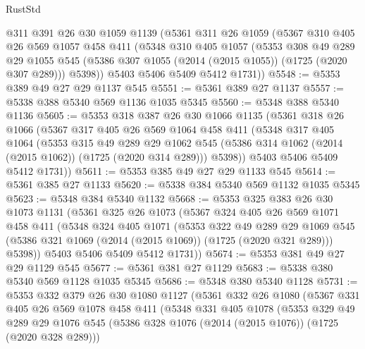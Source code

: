 \begin{lexlean}{RustStd}
\begin{coremodule}
    @311
    @391
    @26
    @30
    @1059
    @1139
    (@5361
      @311
      @26
      @1059
      (@5367
        @310
        @405
        @26
        @569
        @1057
        @458
        @411
        (@5348
          @310
          @405
          @1057
          (@5353
            @308
            @49
            @289
            @29
            @1055
            @545
            (@5386 @307 @1055 (@2014 (@2015 @1055)) (@1725 (@2020 @307 @289)))
            @5398))
        @5403
        @5406
        @5409
        @5412
        @1731))
@5548 := @5353 @389 @49 @27 @29 @1137 @545
@5551 := @5361 @389 @27 @1137
@5557 := @5338 @388 @5340 @569 @1136 @1035 @5345
@5560 := @5348 @388 @5340 @1136
@5605 := @5353
    @318
    @387
    @26
    @30
    @1066
    @1135
    (@5361
      @318
      @26
      @1066
      (@5367
        @317
        @405
        @26
        @569
        @1064
        @458
        @411
        (@5348
          @317
          @405
          @1064
          (@5353
            @315
            @49
            @289
            @29
            @1062
            @545
            (@5386 @314 @1062 (@2014 (@2015 @1062)) (@1725 (@2020 @314 @289)))
            @5398))
        @5403
        @5406
        @5409
        @5412
        @1731))
@5611 := @5353 @385 @49 @27 @29 @1133 @545
@5614 := @5361 @385 @27 @1133
@5620 := @5338 @384 @5340 @569 @1132 @1035 @5345
@5623 := @5348 @384 @5340 @1132
@5668 := @5353
    @325
    @383
    @26
    @30
    @1073
    @1131
    (@5361
      @325
      @26
      @1073
      (@5367
        @324
        @405
        @26
        @569
        @1071
        @458
        @411
        (@5348
          @324
          @405
          @1071
          (@5353
            @322
            @49
            @289
            @29
            @1069
            @545
            (@5386 @321 @1069 (@2014 (@2015 @1069)) (@1725 (@2020 @321 @289)))
            @5398))
        @5403
        @5406
        @5409
        @5412
        @1731))
@5674 := @5353 @381 @49 @27 @29 @1129 @545
@5677 := @5361 @381 @27 @1129
@5683 := @5338 @380 @5340 @569 @1128 @1035 @5345
@5686 := @5348 @380 @5340 @1128
@5731 := @5353
    @332
    @379
    @26
    @30
    @1080
    @1127
    (@5361
      @332
      @26
      @1080
      (@5367
        @331
        @405
        @26
        @569
        @1078
        @458
        @411
        (@5348
          @331
          @405
          @1078
          (@5353
            @329
            @49
            @289
            @29
            @1076
            @545
            (@5386 @328 @1076 (@2014 (@2015 @1076)) (@1725 (@2020 @328 @289)))

\end{coremodule}
\end{lexlean}
